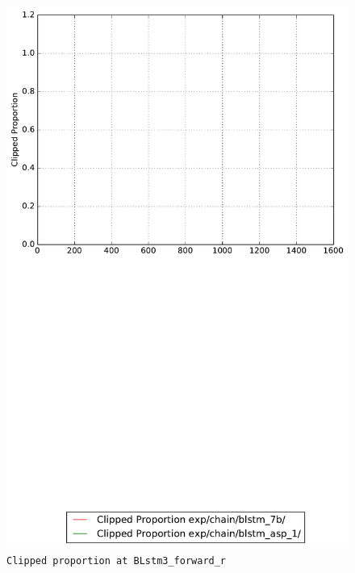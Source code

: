\documentclass[prl,10pt,twocolumn]{revtex4}
\begin{document}
\newpage
\begin{figure}[h]
  \begin{center}
    \caption{\texttt{Clipped proportion at BLstm3\_forward\_r}}
    \includegraphics[width=\textwidth]{exp/chain/blstm_7b/report/clipped_proportion_BLstm3_forward_r.pdf}
  \end{center}
\end{figure}
\clearpage
\end{document}
